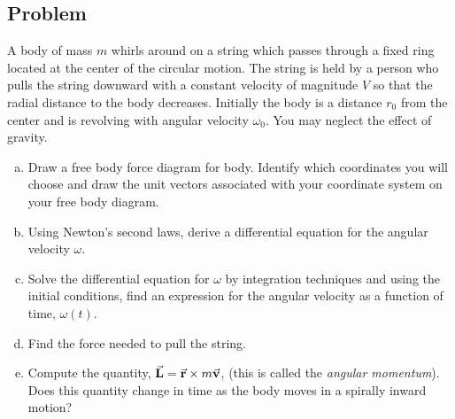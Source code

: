 \documentclass[solutions]{esg8012pset}
\begin{document}
\subsection{Problem}
  A body of mass $m$ whirls around on a string which passes through a fixed ring located at the center of the circular motion. The string is held by a person who pulls the string downward with a constant velocity of magnitude $V$ so that the radial distance to the body decreases. Initially the body is a distance $r_0$ from the center and is revolving
with angular velocity $\omega_0$. You may neglect the effect of gravity.
  \begin{enumerate}[a)]
    \item Draw a free body force diagram for body. Identify which coordinates you will choose and draw the unit vectors associated with your coordinate system on your free body diagram.
    \item Using Newton's second laws, derive a differential equation for the angular velocity $\omega$.
    \item Solve the differential equation for $\omega$ by integration techniques and using the initial conditions, find an expression for the angular velocity as a function of time, $\omega(t)$.
    \item Find the force needed to pull the string.
    \item Compute the quantity, $\vec{\bf{L}} = \vec{\bf{r}}\times m\vec{\bf{v}}$, (this is called the \emph{angular momentum}). Does this quantity change in time as the body moves in a spirally inward motion?
  \end{enumerate}
\end{document}
